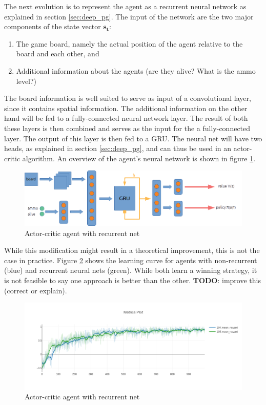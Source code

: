 The next evolution is to represent the agent as a recurrent neural network as explained in section \ref{sec:deep_pg}. The input of the network are the two major components of the state vector $\bm{s_t}$:
\begin{enumerate}
    \item The game board, namely the actual position of the agent relative to the board and each other, and
    \item Additional information about the agents (are they alive? What is the ammo level?)
\end{enumerate}
The board information is well suited to serve as input of a convolutional layer, since it contains spatial information. The additional information on the other hand will be fed to a fully-connected neural network layer. The result of both these layers is then combined and serves as the input for the a fully-connected layer. The output of this layer is then fed to a GRU. The neural net will have two heads, as explained in section \ref{sec:deep_pg}, and can thus be used in an actor-critic algorithm. An overview of the agent's neural network is shown in figure \ref{fig:agent_net}.
\begin{figure}[htp]
    \centering
    \includegraphics[width=16cm]{images/agent_net.png}
    \caption{Actor-critic agent with recurrent net}
    \label{fig:agent_net}
\end{figure}

While this modification might result in a theoretical improvement, this is not the case in practice. Figure \ref{fig:newplot194_195} shows the learning curve for agents with non-recurrent (blue) and recurrent neural nets (green). While both learn a winning strategy, it is not feasible to say one approach is better than the other. \textbf{TODO}: improve this (correct or explain).

\begin{figure}[htp]
    \centering
    \includegraphics[width=16cm]{images/experiment2/newplot194_195.png}
    \caption{Actor-critic agent with recurrent net}
    \label{fig:newplot194_195}
\end{figure}

